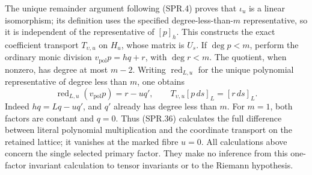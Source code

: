 The unique remainder argument following (SPR.4) proves that
\(\iota_u\) is a linear isomorphism; its definition uses the
specified degree-less-than-\(m\) representative, so it is independent
of the representative of \([p]_h\). This constructs the exact
coefficient transport \(T_{\upsilon,u}\) on \(H_u\), whose matrix is
\(U_s\). If \(\deg p<m\), perform the ordinary monic division
\(v_{\mathrm{pol}}p=hq+r\), with \(\deg r<m\).
The quotient, when nonzero, has degree at most \(m-2\).
Writing \(\operatorname{red}_{L,u}\) for the unique polynomial
representative of degree less than \(m\), one obtains
\[
 \operatorname{red}_{L,u}(v_{\mathrm{pol}}p)
     =r-uq',\qquad
 T_{\upsilon,u}[p\,ds]_L=[r\,ds]_L .
 \tag{SPR.36}
\]
Indeed \(hq=Lq-uq'\), and \(q'\) already has degree less than
\(m\). For \(m=1\), both factors are constant and \(q=0\).
Thus (SPR.36) calculates the full difference between literal
polynomial multiplication and the coordinate transport on the
retained lattice; it vanishes at the marked fibre \(u=0\).
All calculations above concern the single selected primary factor.
They make no inference from this one-factor invariant calculation
to tensor invariants or to the Riemann hypothesis.
